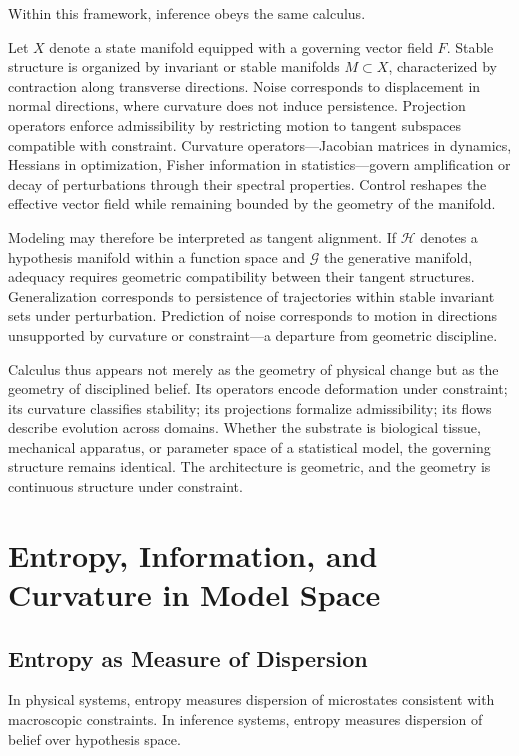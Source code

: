 \documentclass[12pt]{book}
\begin{document}
Within this framework, inference obeys the same calculus.

Let $X$ denote a state manifold equipped with a governing vector field $F$. Stable structure is organized by invariant or stable manifolds $M \subset X$, characterized by contraction along transverse directions. Noise corresponds to displacement in normal directions, where curvature does not induce persistence. Projection operators enforce admissibility by restricting motion to tangent subspaces compatible with constraint. Curvature operators---Jacobian matrices in dynamics, Hessians in optimization, Fisher information in statistics---govern amplification or decay of perturbations through their spectral properties. Control reshapes the effective vector field while remaining bounded by the geometry of the manifold.

Modeling may therefore be interpreted as tangent alignment. If $\mathcal{H}$ denotes a hypothesis manifold within a function space and $\mathcal{G}$ the generative manifold, adequacy requires geometric compatibility between their tangent structures. Generalization corresponds to persistence of trajectories within stable invariant sets under perturbation. Prediction of noise corresponds to motion in directions unsupported by curvature or constraint---a departure from geometric discipline.

Calculus thus appears not merely as the geometry of physical change but as the geometry of disciplined belief. Its operators encode deformation under constraint; its curvature classifies stability; its projections formalize admissibility; its flows describe evolution across domains. Whether the substrate is biological tissue, mechanical apparatus, or parameter space of a statistical model, the governing structure remains identical. The architecture is geometric, and the geometry is continuous structure under constraint.

\chapter{Entropy, Information, and Curvature in Model Space}

\section{Entropy as Measure of Dispersion}

In physical systems, entropy measures dispersion of microstates consistent with macroscopic constraints. In inference systems, entropy measures dispersion of belief over hypothesis space.
\end{document}
